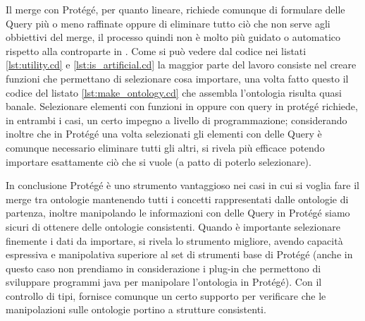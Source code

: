 Il merge con Protégé, per quanto lineare, richiede comunque di formulare delle Query più o meno raffinate oppure di eliminare tutto ciò che non serve agli obbiettivi del merge, il processo quindi non è molto più guidato o automatico rispetto alla controparte in \cduce. Come si può vedere dal codice nei listati \ref{lst:utility.cd} e \ref{lst:is_artificial.cd} la maggior parte del lavoro consiste nel creare funzioni che permettano di selezionare cosa importare, una volta fatto questo il codice del listato \ref{lst:make_ontology.cd} che assembla l'ontologia risulta quasi banale. Selezionare elementi con funzioni in \cduce oppure con query in protégé richiede, in entrambi i casi, un certo impegno a livello di programmazione; considerando inoltre che in Protégé una volta selezionati gli elementi con delle Query è comunque necessario eliminare tutti gli altri, \cduce si rivela più efficace potendo importare esattamente ciò che si vuole (a patto di poterlo selezionare).

In conclusione Protégé è uno strumento vantaggioso nei casi in cui si voglia fare il merge tra ontologie mantenendo tutti i concetti rappresentati dalle ontologie di partenza, inoltre manipolando le informazioni con delle Query in Protégé siamo sicuri di ottenere delle ontologie consistenti. Quando è importante selezionare finemente i dati da importare, \cduce si rivela lo strumento migliore, avendo capacità espressiva e manipolativa superiore al set di strumenti base di Protégé (anche in questo caso non prendiamo in considerazione i plug-in che permettono di sviluppare programmi java per manipolare l'ontologia in Protégé). Con il controllo di tipi, \cduce fornisce comunque un certo supporto per verificare che le manipolazioni sulle ontologie portino a strutture consistenti.